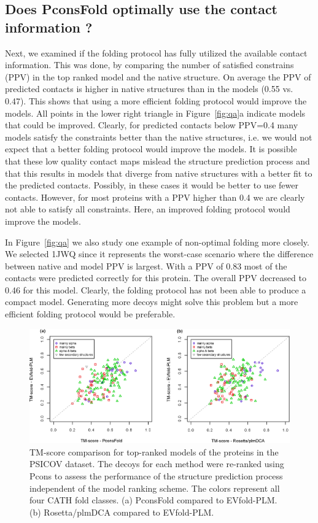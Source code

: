\documentclass{bioinfo}
\begin{document}
\subsection{Does PconsFold optimally use the contact information ? }

Next, we examined if the folding protocol has fully utilized the
available contact information. This was done, by comparing the number
of satisfied constrains (PPV) in the top ranked model and the native
structure.  On average the PPV of predicted contacts is higher in
native structures than in the models (0.55 vs. 0.47). This shows that
using a more efficient folding protocol would improve the models. All
points in the lower right triangle in Figure~\ref{fig:qa}a indicate
models that could be improved.  Clearly, for predicted contacts below
PPV=0.4 many models satisfy the constraints better than the native
structures, i.e. we would not expect that a better folding protocol
would improve the models.  It is possible that these low quality
contact maps mislead the structure prediction process and that this
results in models that diverge from native structures with a better
fit to the predicted contacts. Possibly, in these cases it would be
better to use fewer contacts. 
However, for most proteins with a PPV higher than 0.4 we are
clearly not able to satisfy all constraints. Here, an improved folding
protocol would improve the models.


In Figure~\ref{fig:qa} we also study one example of non-optimal
folding more closely. We selected 1JWQ since it represents the
worst-case scenario where the difference between native and model PPV
is largest. With a PPV of 0.83 most of the contacts were predicted
correctly for this protein. The overall PPV decreased to 0.46 for this
model. Clearly, the folding protocol has not been able to produce a
compact model. Generating more decoys might solve this problem but a
more efficient folding protocol would be preferable.





\begin{figure}[!tpb]%
\centerline{\includegraphics[scale=0.7]{figures/vs.eps}}
\caption{TM-score comparison for top-ranked models of the proteins in
 the PSICOV dataset. The decoys for each method were re-ranked using
 Pcons to assess the performance of the structure prediction process
 independent of the model ranking scheme. The colors represent all
 four CATH fold classes. (a) PconsFold compared to EVfold-PLM. (b)
 Rosetta/plmDCA compared to EVfold-PLM.}\label{fig:vs}
\end{figure}
\end{document}

